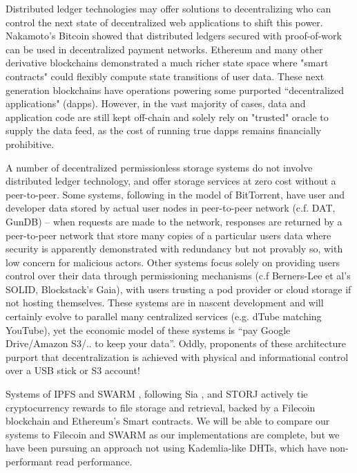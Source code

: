 \documentclass[journal]{IEEEtran}
\begin{document}
Distributed ledger technologies may offer solutions to decentralizing who can control the next state of decentralized web applications to shift this power.  Nakamoto's Bitcoin showed that distributed ledgers secured with proof-of-work can be used in decentralized payment networks.  Ethereum and many other derivative blockchains demonstrated a much richer state space where "smart contracts" could flexibly compute state transitions of user data.  These next generation blockchains have operations powering some purported ``decentralized applications" (dapps). However, in the vast majority of cases, data and application code are still kept off-chain and solely rely on "trusted" oracle to supply the data feed, as the cost of running true dapps remains financially prohibitive.

A number of decentralized permissionless storage systems do not involve distributed ledger technology, and offer storage services at zero cost without a peer-to-peer.  Some systems, following in the model of BitTorrent, have user and developer data stored by actual user nodes in peer-to-peer network (c.f. DAT, GunDB) -- when requests are made to the network, responses are returned by a peer-to-peer network that store many copies of a particular users data where security is apparently demonstrated with redundancy but not provably so, with low concern for malicious actors.  Other systems focus solely on providing users control over their data through permissioning mechanisms (c.f Berners-Lee et al's SOLID, Blockstack's Gaia), with users trusting a pod provider or cloud storage if not hosting themselves.  These systems are in nascent development and will certainly evolve to parallel many centralized services (e.g. dTube matching YouTube), yet the economic model of these systems is ``pay Google Drive/Amazon S3/.. to keep your data''.  Oddly, proponents of these architecture purport that decentralization is achieved with physical and informational control over a USB stick or S3 account!

Systems of IPFS \cite{filecoin} and SWARM \cite{swarm}, following Sia \cite{sia}, and STORJ \cite{storj} actively tie cryptocurrency rewards to file storage and retrieval, backed by a Filecoin blockchain and Ethereum's Smart contracts.  We will be able to compare our systems to Filecoin and SWARM as our implementations are complete, but we have been pursuing an approach not using Kademlia-like DHTs, which have non-performant read performance.
\end{document}
